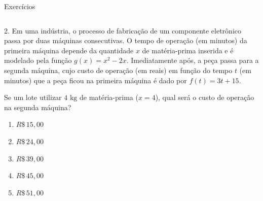 \documentclass[aspectratio=169, t, 8pt]{beamer}
\begin{document}
    \begin{frame} {Exercícios} %
        \begin{columns}[totalwidth=.9\textwidth]
            \begin{column}{\textwidth}
                2. Em uma indústria, o processo de fabricação de um componente eletrônico passa por duas máquinas consecutivas. O tempo de operação (em minutos) da primeira máquina depende da quantidade $x$ de matéria-prima inserida e é modelado pela função $g(x) = x^2 - 2x$. Imediatamente após, a peça passa para a segunda máquina, cujo custo de operação (em reais) em função do tempo $t$ (em minutos) que a peça ficou na primeira máquina é dado por $f(t) = 3t + 15$.
                
                \vspace{1em}

                Se um lote utilizar $4\text{ kg}$ de matéria-prima ($x = 4$), qual será o custo de operação na segunda máquina?

                \begin{enumerate}[label=\alph*)]
                    \item $R\$ \, 15,00$
                    \item $R\$ \, 24,00$
                    \item $R\$ \, 39,00$
                    \item $R\$ \, 45,00$
                    \item $R\$ \, 51,00$
                \end{enumerate}
            \end{column}
        \end{columns}
    \end{frame}
\end{document}
